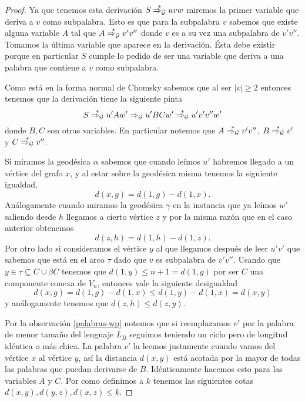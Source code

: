 \documentclass[tesis.tex]{subfiles}
\newcommand{\deriva}{\overset{*}{\Rightarrow_{\cal G}}}
\begin{document}
\begin{proof}
Ya que tenemos esta derivación $S \deriva uvw$ miremos la primer variable que deriva a $v$ como subpalabra. 
Esto es que para la subpalabra $v$ sabemos que existe alguna variable $A$ tal que $A \deriva v'v''$ donde $v$ es a su vez una subpalabra de $v'v''$. 
Tomamos la última variable que aparece en la derivación.
Ésta debe existir porque en particular $S$ cumple lo pedido de ser una variable que deriva a una palabra que contiene a $v$ como subpalabra.

Como está en la forma normal de Chomsky sabemos que al ser $|v| \ge 2$ entonces tenemos que la derivación tiene la siguiente pinta
\begin{equation*}
	S \deriva u'Aw' \Rightarrow_{\cal G} u'BC w' \deriva u'v'v''w'
\end{equation*}
donde $B,C$ son otras variables. En particular notemos que $A \deriva v'v''$, $B \deriva v'$ y $C \deriva v''$.


Si miramos la geodésica $\alpha$ sabemos que cuando leímos $u'$ habremos llegado a un vértice del grafo $x$, y al estar sobre la geodésica misma tenemos la siguiente igualdad,
\begin{equation*}
d(x,g) = d(1,g) - d(1,x).
\end{equation*}
Análogamente cuando miramos la geodésica $\gamma$ en la instancia que ya leímos $w'$ saliendo desde $h$ llegamos a cierto vértice $z$ y por la misma razón que en el caso anterior obtenemos
\begin{equation*}
	d(z,h) = d(1,h) - d(1,z).
\end{equation*}
Por otro lado si consideramos el vértice $y$ al que llegamos después de leer $u'v'$ que sabemos que está en el arco $\tau$ dado que $v$ es subpalabra de $v'v''$.
Usando que $y \in \tau \subseteq C \cup \beta C$ tenemos que $d(1,y) \le n+1 = d(1,g)$ por ser $C$ una componente conexa de $V_n$, entonces vale la siguiente desigualdad
\begin{equation*}
d(x,g) = d(1,g) - d(1,x) \le d(1,y) - d(1,x) = d(x,y)
\end{equation*}
y análogamente tenemos que $d(z,h) \le d(z,y)$.


Por la observación \ref{palabras-wp} notemos que si reemplazamos $v'$ por la palabra de menor tamaño del lenguaje $L_B$ seguimos teniendo un ciclo pero de longitud idéntica o más chica. 
La palabra $v'$ la leemos justamente cuando vamos del vértice $x$ al vértice $y$, así la distancia  $d(x,y)$ está acotada por la mayor de todas las palabras que puedan derivarse de $B$. 
Idénticamente hacemos esto para las variables $A$ y $C$.
Por como definimos a $k$ tenemos las siguientes cotas $d(x,y), d(y,z), d(x,z) \le k$.



\end{proof}
\end{document}
